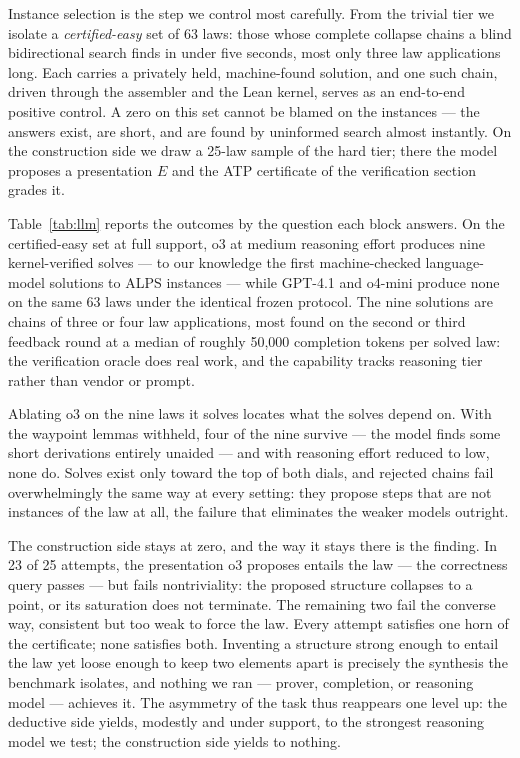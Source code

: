 \documentclass[letterpaper]{article} %
\begin{document}
Instance selection is the step we control most carefully. From the trivial tier we isolate a \emph{certified-easy} set of 63 laws: those whose complete collapse chains a blind bidirectional search finds in under five seconds, most only three law applications long. Each carries a privately held, machine-found solution, and one such chain, driven through the assembler and the Lean kernel, serves as an end-to-end positive control. A zero on this set cannot be blamed on the instances — the answers exist, are short, and are found by uninformed search almost instantly. On the construction side we draw a 25-law sample of the hard tier; there the model proposes a presentation $E$ and the ATP certificate of the verification section grades it.
 
Table~\ref{tab:llm} reports the outcomes by the question each block answers. On the certified-easy set at full support, o3 at medium reasoning effort produces nine kernel-verified solves — to our knowledge the first machine-checked language-model solutions to ALPS instances — while GPT-4.1 and o4-mini produce none on the same 63 laws under the identical frozen protocol. The nine solutions are chains of three or four law applications, most found on the second or third feedback round at a median of roughly 50{,}000 completion tokens per solved law: the verification oracle does real work, and the capability tracks reasoning tier rather than vendor or prompt.
 
Ablating o3 on the nine laws it solves locates what the solves depend on. With the waypoint lemmas withheld, four of the nine survive — the model finds some short derivations entirely unaided — and with reasoning effort reduced to low, none do. Solves exist only toward the top of both dials, and rejected chains fail overwhelmingly the same way at every setting: they propose steps that are not instances of the law at all, the failure that eliminates the weaker models outright.
 
The construction side stays at zero, and the way it stays there is the finding. In 23 of 25 attempts, the presentation o3 proposes entails the law — the correctness query passes — but fails nontriviality: the proposed structure collapses to a point, or its saturation does not terminate. The remaining two fail the converse way, consistent but too weak to force the law. Every attempt satisfies one horn of the certificate; none satisfies both. Inventing a structure strong enough to entail the law yet loose enough to keep two elements apart is precisely the synthesis the benchmark isolates, and nothing we ran — prover, completion, or reasoning model — achieves it. The asymmetry of the task thus reappears one level up: the deductive side yields, modestly and under support, to the strongest reasoning model we test; the construction side yields to nothing.
\end{document}
